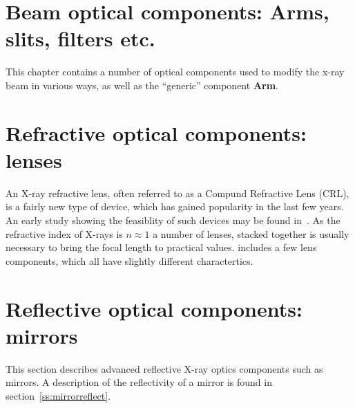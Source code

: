 
\chapter{Beam optical components:
Arms, slits, filters etc.}
This chapter contains a number of optical components
used to modify the x-ray beam in various ways,
as well as the ``generic'' component \textbf{Arm}.













\newpage
\chapter{Refractive optical components: lenses}
\label{c:lenses}

An X-ray refractive lens, often referred to as a Compund Refractive Lens (CRL), is a fairly new type of device, which has gained popularity in
the last few years. An early study showing the feasiblity of such devices may be found in~\cite{snigirev1996}. As the refractive index of X-rays
is $n\approx1$ a number of lenses, stacked together is usually necessary to bring the focal length to practical values. 
\MCX includes a few lens components, which all have slightly different charactertics.

%








\newpage
\chapter{Reflective optical components: mirrors}
\label{c:mirrors}
This section describes advanced reflective X-ray optics
components such as mirrors.
A description of the reflectivity of a mirror is found
in section~\ref{ss:mirrorreflect}.
%






